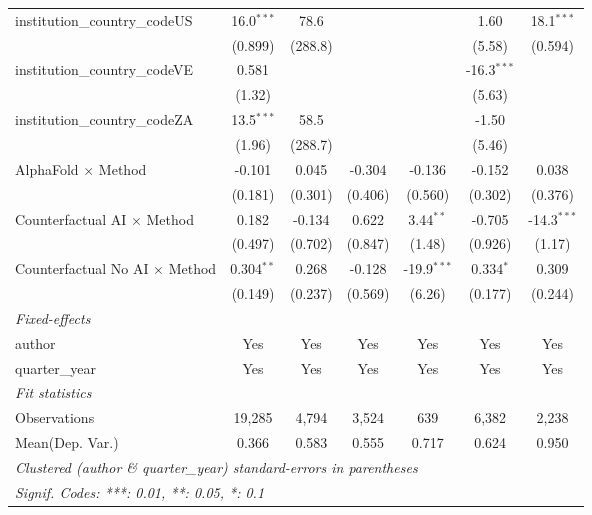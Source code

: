 \begin{tabular}{lcccccc}
   institution\_country\_codeUS          & 16.0$^{***}$  & 78.6         &               &               & 1.60          & 18.1$^{***}$\\   
                                         & (0.899)       & (288.8)      &               &               & (5.58)        & (0.594)\\   
   institution\_country\_codeVE          & 0.581         &              &               &               & -16.3$^{***}$ &   \\   
                                         & (1.32)        &              &               &               & (5.63)        &   \\   
   institution\_country\_codeZA          & 13.5$^{***}$  & 58.5         &               &               & -1.50         &   \\   
                                         & (1.96)        & (288.7)      &               &               & (5.46)        &   \\   
   AlphaFold $\times$ Method             & -0.101        & 0.045        & -0.304        & -0.136        & -0.152        & 0.038\\   
                                         & (0.181)       & (0.301)      & (0.406)       & (0.560)       & (0.302)       & (0.376)\\   
   Counterfactual AI $\times$ Method     & 0.182         & -0.134       & 0.622         & 3.44$^{**}$   & -0.705        & -14.3$^{***}$\\   
                                         & (0.497)       & (0.702)      & (0.847)       & (1.48)        & (0.926)       & (1.17)\\   
   Counterfactual No AI $\times$ Method  & 0.304$^{**}$  & 0.268        & -0.128        & -19.9$^{***}$ & 0.334$^{*}$   & 0.309\\   
                                         & (0.149)       & (0.237)      & (0.569)       & (6.26)        & (0.177)       & (0.244)\\   
   \midrule
   \emph{Fixed-effects}\\
   author                                & Yes           & Yes          & Yes           & Yes           & Yes           & Yes\\  
   quarter\_year                         & Yes           & Yes          & Yes           & Yes           & Yes           & Yes\\  
   \midrule
   \emph{Fit statistics}\\
   Observations                          & 19,285        & 4,794        & 3,524         & 639           & 6,382         & 2,238\\  
Mean(Dep. Var.) & 0.366 & 0.583 & 0.555 & 0.717 & 0.624 & 0.950 \\
   \midrule \midrule
   \multicolumn{7}{l}{\emph{Clustered (author \& quarter\_year) standard-errors in parentheses}}\\
   \multicolumn{7}{l}{\emph{Signif. Codes: ***: 0.01, **: 0.05, *: 0.1}}\\
\end{tabular}
\par\endgroup
